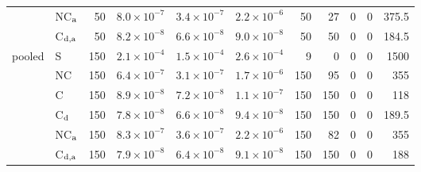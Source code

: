 \begin{tabular}{@{}llr ccc rrrr r@{}}
 & NC$_{\rm a}$ & 50 & $8.0\times10^{-7}$ & $3.4\times10^{-7}$ & $2.2\times10^{-6}$ & 50 & 27 & 0 & 0 & 375.5\\
 & C$_{\rm d,a}$ & 50 & $8.2\times10^{-8}$ & $6.6\times10^{-8}$ & $9.0\times10^{-8}$ & 50 & 50 & 0 & 0 & 184.5\\
\midrule
pooled & S & 150 & $2.1\times10^{-4}$ & $1.5\times10^{-4}$ & $2.6\times10^{-4}$ & 9 & 0 & 0 & 0 & 1500\\
 & NC & 150 & $6.4\times10^{-7}$ & $3.1\times10^{-7}$ & $1.7\times10^{-6}$ & 150 & 95 & 0 & 0 & 355\\
 & C & 150 & $8.9\times10^{-8}$ & $7.2\times10^{-8}$ & $1.1\times10^{-7}$ & 150 & 150 & 0 & 0 & 118\\
 & C$_{\rm d}$ & 150 & $7.8\times10^{-8}$ & $6.6\times10^{-8}$ & $9.4\times10^{-8}$ & 150 & 150 & 0 & 0 & 189.5\\
 & NC$_{\rm a}$ & 150 & $8.3\times10^{-7}$ & $3.6\times10^{-7}$ & $2.2\times10^{-6}$ & 150 & 82 & 0 & 0 & 355\\
 & C$_{\rm d,a}$ & 150 & $7.9\times10^{-8}$ & $6.4\times10^{-8}$ & $9.1\times10^{-8}$ & 150 & 150 & 0 & 0 & 188\\
\bottomrule
\end{tabular}
